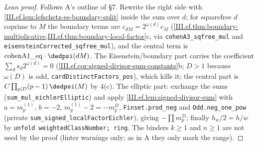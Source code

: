 \begin{proof}[Lean proof]
Follows A's outline of \S7. Rewrite the right side with \cref{III.ef.lem:lefschetz-es-boundary-split} inside the sum over $d$; for squarefree $d$ coprime to $M$ the boundary terms are $c_{dM}=2^{\omega(d)}c_M$ (\cref{III.ef.thm:boundary-multiplicative,III.ef.thm:boundary-local-factor}c, via \texttt{cohenA3\_sqfree\_mul} and \texttt{eisensteinCorrected\_sqfree\_mul}), and the central term is $\mathrm{cohenA1\_eq}\cdot\dedpsi(dM)$. The Eisenstein/boundary part carries the coefficient $\sum_d s_d2^{\omega(d)}=0$ (\cref{III.ef.cor:signed-divisor-sum-constants}b; $D>1$ because $\omega(D)$ is odd, \texttt{cardDistinctFactors\_pos}), which kills it; the central part is $C\prod_{p\mid D}(p-1)\,\dedpsi(M)$ by 4(c). The elliptic part: exchange the sums (\texttt{sum\_mul\_eichlerElliptic}) and apply \cref{III.ef.lem:signed-divisor-sum} with $a=m^{(1)}_p$, $b=-2$, $m^{(1)}_p-2=-m^D_p$, \texttt{Finset.prod\_neg} and \texttt{Odd.neg\_one\_pow} (private \texttt{sum\_signed\_localFactorEichler}), giving $-\prod m^D_p$; finally $h_w/2=h/w$ by \texttt{unfold weightedClassNumber; ring}. The binders $k\ge1$ and $n\ge1$ are not used by the proof (linter warnings only; as in A they only mark the range).
\end{proof}

